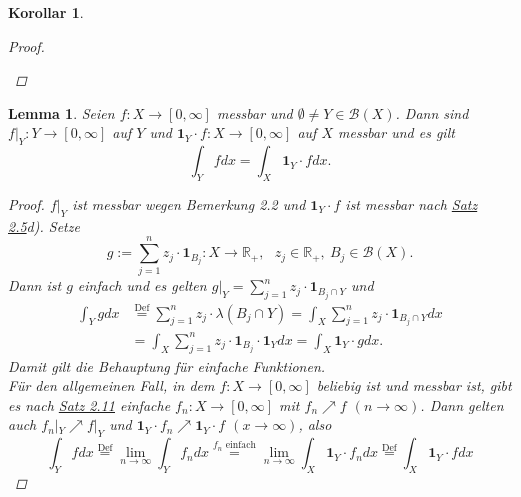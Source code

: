 \documentclass[a4paper]{scrreprt}
\newcommand{\doubleOne}{\textbf{1}}
\newcommand{\R}{\mathbb{R}}
\newcommand{\Borel}{\mathcal{B}}
\newcommand{\toInf}{\rightarrow \infty}
\newcommand{\limToInf}[1]{\lim_{#1 \toInf}}
\newcommand{\jlabel}[1]{\label{j_#1}}
\newcommand{\jhyperref}[2]{\hyperref[j_#1]{#2}}
\newcommand{\jlink}[1]{\jhyperref{#1}{#1}}
\newcommand{\jabb}[3]{ #1: #2 \rightarrow #3 }
\theoremstyle{plain}
\newtheorem{lem}[thm]{Lemma}
\newtheorem{kor}[thm]{Korollar}
\theoremstyle{definition}
\begin{document}
{{{\begin{kor}
\begin{proof}
\begin{enumerate}
        \end{enumerate}
    \end{proof}
\end{kor}

\begin{lem}
\jlabel{Lem 2.21}
    Seien $\jabb{f}{X}{[0,\infty]}$ messbar und $\emptyset \ne Y \in \Borel(X)$. Dann sind $\jabb{f|_Y}{Y}{[0,\infty]}$ auf $Y$ und $\jabb{\doubleOne_{Y}\cdot f}{X}{[0,\infty]}$ auf $X$ messbar und es gilt
    \begin{displaymath}
        \int_Y f dx = \int_X \doubleOne_Y\cdot f dx.
    \end{displaymath}
    \begin{proof}
        $f|_Y$ ist messbar wegen Bemerkung 2.2 und $\doubleOne_Y\cdot f$ ist messbar nach \jlink{Satz 2.5}d). Setze
        \begin{displaymath}
            g:= \jabb{\sum_{j=1}^n z_j \cdot \doubleOne_{B_j}}{X}{\R_+}, \ \ \ z_j\in \R_+,\ B_j \in \Borel(X).
        \end{displaymath}
        Dann ist $g$ einfach und es gelten $g|_Y = \sum_{j=1}^n z_j\cdot \doubleOne_{B_j \cap Y}$ und
        \begin{displaymath}
            \begin{split}
                \int_Y g dx &\overset{\text{Def}}{=} \sum_{j=1}^n z_j \cdot\lambda(B_j\cap Y) = \int_X \sum_{j=1}^n z_j \cdot \doubleOne_{B_j \cap Y} dx\\
                &= \int_X \sum_{j=1}^n z_j \cdot \doubleOne_{B_j}\cdot \doubleOne_Y dx = \int_X \doubleOne_Y \cdot g dx.
            \end{split}
        \end{displaymath}
        Damit gilt die Behauptung für einfache Funktionen.\\
        Für den allgemeinen Fall, in dem $\jabb{f}{X}{[0,\infty]}$ beliebig ist und messbar ist, gibt es nach \jlink{Satz 2.11} einfache $\jabb{f_n}{X}{[0,\infty]}$ mit $f_n \nearrow f$ $(n\rightarrow \infty)$. Dann gelten auch $f_n|_Y \nearrow f|_Y$ und $\doubleOne_Y \cdot f_n \nearrow \doubleOne_Y \cdot f$ $(x \rightarrow \infty)$, also
        \begin{displaymath}
            \int_Yf dx \overset{\text{Def}}{=} \limToInf{n} \int_Y f_n dx \overset{\text{$f_n$ einfach}}{=} \limToInf{n} \int_X \doubleOne_Y\cdot f_n dx \overset{\text{Def}}{=} \int_X \doubleOne_Y \cdot f dx
        \end{displaymath}
    \end{proof}
\end{lem}


}}}
\end{document}
